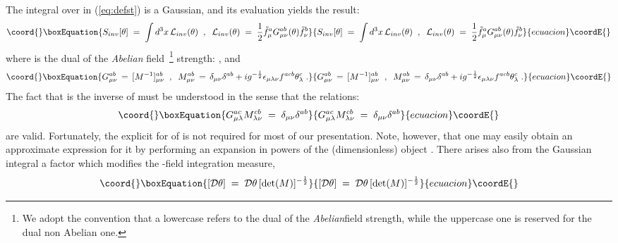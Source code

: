 \documentclass[a4paper,12pt]{article}
\begin{document}
The integral over \coordHE{} in (\ref{eq:defst}) is a Gaussian, and its
evaluation yields the result:
\begin{equation}\coord{}\boxEquation{\label{eq:st}
S_{inv}[\theta] \;=\; \int d^3x \, {\mathcal L}_{inv}(\theta)\;\;,\;\;
{\mathcal L}_{inv}(\theta) \;=\; \frac{1}{2} {\tilde f}_\mu^a
G_{\mu\nu}^{ab}(\theta){\tilde f}_\nu^b
}{S_{inv}[\theta] \;=\; \int d^3x \, {\mathcal L}_{inv}(\theta)\;\;,\;\;
{\mathcal L}_{inv}(\theta) \;=\; \frac{1}{2} {\tilde f}_\mu^a
G_{\mu\nu}^{ab}(\theta){\tilde f}_\nu^b
}{ecuacion}\coordE{}\end{equation}
where \coordHE{} is the dual of the {\em Abelian\/} field~\footnote{
  We adopt the convention that a lowercase \coordHE{} refers to the dual
  of the {\em Abelian\/}field strength, while the uppercase one is
  reserved for the dual non Abelian one.} strength: \mbox{\coordHE{}}, and
\begin{equation}\coord{}\boxEquation{\label{eq:defg}
G_{\mu\nu}^{ab} \,=\, [ M^{-1} ]_{\mu\nu}^{ab}
\;\;,\;\;
M_{\mu\nu}^{ab}\,=\, \delta_{\mu\nu}\delta^{ab} + i g^{-\frac{1}{2}}
\epsilon_{\mu\lambda\nu} f^{acb} \theta_\lambda^c\;.
}{G_{\mu\nu}^{ab} \,=\, [ M^{-1} ]_{\mu\nu}^{ab}
\;\;,\;\;
M_{\mu\nu}^{ab}\,=\, \delta_{\mu\nu}\delta^{ab} + i g^{-\frac{1}{2}}
\epsilon_{\mu\lambda\nu} f^{acb} \theta_\lambda^c\;.
}{ecuacion}\coordE{}\end{equation}
The fact that \coordHE{} is the inverse of \coordHE{} must be understood in the
sense that the relations:
\begin{equation}\coord{}\boxEquation{\label{eq:definv}
G_{\mu\lambda}^{ac} M_{\lambda\nu}^{cb} \;=\; \delta_{\mu\nu} \delta^{ab}
}{G_{\mu\lambda}^{ac} M_{\lambda\nu}^{cb} \;=\; \delta_{\mu\nu} \delta^{ab}
}{ecuacion}\coordE{}\end{equation}
are valid. Fortunately, the explicit for of \coordHE{} is not required for
most of our presentation. Note, however, that one may easily obtain an
approximate expression for it by performing an expansion in powers of
the (dimensionless) object \coordHE{}.  There arises
also from the Gaussian integral a factor which modifies the
\myHighlight{$\theta$}\coordHE{}-field integration measure,
\begin{equation}\coord{}\boxEquation{\label{eq:thmeas}
[{\mathcal D}\theta]\;=\; {\mathcal D}\theta \, [\det(M)]^{-\frac{1}{2}}
}{[{\mathcal D}\theta]\;=\; {\mathcal D}\theta \, [\det(M)]^{-\frac{1}{2}}
}{ecuacion}\coordE{}\end{equation}
\end{document}
